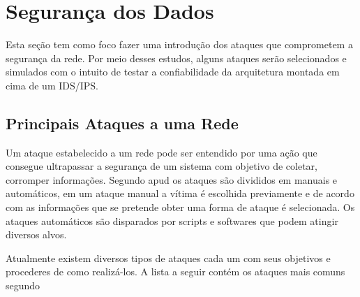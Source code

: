 \chapter{Segurança dos Dados}
\label{chap:Seguranca}

	Esta seção tem como foco fazer uma introdução dos ataques que comprometem a segurança da rede. Por meio desses estudos, alguns ataques serão selecionados e simulados com o intuito de testar a confiabilidade da arquitetura montada em cima de um IDS/IPS.

	\section{Principais Ataques a uma Rede}
	\label{sec:Seguranca_PA}

		Um ataque estabelecido a um rede pode ser entendido por uma ação que consegue ultrapassar a segurança de um sistema com objetivo de coletar, corromper informações. Segundo \cite{Verissimo} apud \cite{Morais} os ataques são divididos em manuais e automáticos, em um ataque manual a vítima é escolhida previamente e de acordo com as informações que se pretende obter uma forma de ataque é selecionada. Os ataques automáticos são disparados por scripts e softwares que podem atingir diversos alvos. 


		Atualmente existem diversos tipos de ataques cada um com seus objetivos e procederes de como realizá-los. A lista a seguir contém os ataques mais comuns segundo \cite{Morais}

